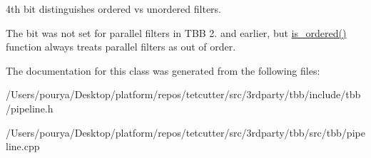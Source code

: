 4th bit distinguishes ordered vs unordered filters. 

The bit was not set for parallel filters in T\+B\+B 2. and earlier, but \hyperlink{classtbb_1_1filter_ace53ff32ffb066e52c44f439c9150a05}{is\+\_\+ordered()} function always treats parallel filters as out of order. 

The documentation for this class was generated from the following files\+:\begin{DoxyCompactItemize}
\item 
/\+Users/pourya/\+Desktop/platform/repos/tetcutter/src/3rdparty/tbb/include/tbb/pipeline.\+h\item 
/\+Users/pourya/\+Desktop/platform/repos/tetcutter/src/3rdparty/tbb/src/tbb/pipeline.\+cpp\end{DoxyCompactItemize}

